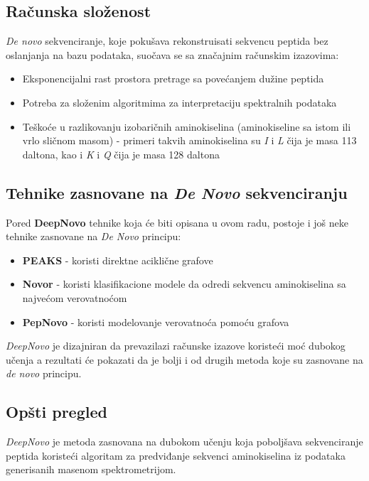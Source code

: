 \documentclass[12pt,oneside]{memoir}
\begin{document}
\subsection{Računska složenost}
\emph{De novo} sekvenciranje, koje pokušava rekonstruisati sekvencu peptida bez oslanjanja na bazu podataka, suočava se sa značajnim računskim izazovima:

\begin{itemize}
\item Eksponencijalni rast prostora pretrage sa povećanjem dužine peptida
\item Potreba za složenim algoritmima za interpretaciju spektralnih podataka
\item Teškoće u razlikovanju izobaričnih aminokiselina (aminokiseline sa istom ili vrlo sličnom masom) - primeri takvih aminokiselina su \textit{I} i \textit{L} čija je masa 113 daltona, kao i \textit{K} i \textit{Q} čija je masa 128 daltona
\end{itemize}

\subsection{Tehnike zasnovane na \emph{De Novo} sekvenciranju}
Pored \textbf{DeepNovo} tehnike koja će biti opisana u ovom radu, postoje i još neke tehnike zasnovane na \emph{De Novo} principu:

\begin{itemize}
\item \textbf{PEAKS} \cite{peaks} - koristi direktne aciklične grafove
\item \textbf{Novor} \cite{novor} - koristi klasifikacione modele da odredi sekvencu aminokiselina sa najvećom verovatnoćom
\item \textbf{PepNovo} \cite{pepnovo} - koristi modelovanje verovatnoća pomoću grafova
\end{itemize}

\emph{DeepNovo} je dizajniran da prevazilazi računske izazove koristeći moć dubokog učenja a rezultati će pokazati da je bolji i od drugih metoda koje su zasnovane na \emph{de novo} principu.

\subsection{Opšti pregled}
\emph{DeepNovo} \cite{deepnovo} je metoda zasnovana na dubokom učenju koja poboljšava sekvenciranje peptida koristeći algoritam za predviđanje sekvenci aminokiselina iz podataka generisanih masenom spektrometrijom.
\end{document}
